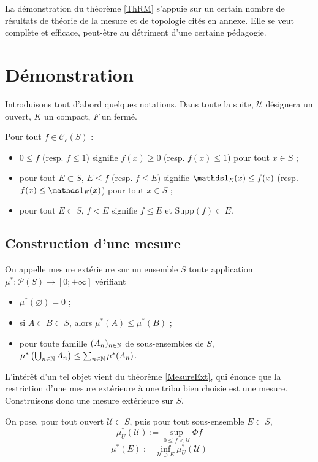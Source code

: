 \documentclass{article}
\begin{document}
La démonstration du théorème \ref{ThRM} s'appuie sur un certain nombre de résultats de théorie de la mesure et de topologie cités en annexe. Elle se veut complète et efficace, peut-être au détriment d'une certaine pédagogie.

\section{Démonstration}

Introduisons tout d'abord quelques notations. Dans toute la suite, $\mathcal U$ désignera un ouvert, $K$ un compact, $F$ un fermé.

Pour tout $f\in\mathcal C_c(S)$ :
\begin{itemize}
\item $0\leq f$ (resp. $f\leq1$) signifie $f(x)\geq 0$ (resp. $f(x)\leq1$) pour tout $x\in S$ ;
\item pour tout $E\subset S$, $E\leq f$ (resp. $f\leq E$) signifie $\Ind{E}(x)\leq f(x)$ (resp. $f(x)\leq\Ind{E}(x)$) pour tout $x\in S$ ;
\item pour tout $E\subset S$, $f<E$ signifie $f\leq E$ et $\mathrm{Supp}(f)\subset E$.
\end{itemize}

\subsection{Construction d'une mesure}

On appelle mesure extérieure sur un ensemble $S$ toute application $\mu^*:\mathcal P(S)\to[0;+\infty]$ vérifiant
\begin{itemize}
\item $\mu^*(\varnothing)=0$ ;
\item si $A\subset B\subset S$, alors $\mu^*(A)\leq\mu^*(B)$ ;
\item pour toute famille $(A_n)_{n\in\mathbb{N}}$ de sous-ensembles de $S$, $\mu^*\left(\bigcup_{n\in\mathbb{N}}A_n\right)\leq\sum_{n\in\mathbb{N}}\mu^*(A_n)$. 
\end{itemize}

L'intérêt d'un tel objet vient du théorème \ref{MesureExt}, qui énonce que la restriction d'une mesure extérieure à une tribu bien choisie est une mesure. Construisons donc une mesure extérieure sur $S$.
\bigskip

On pose, pour tout ouvert $\mathcal U\subset S$, puis pour tout sous-ensemble $E\subset S$,
$$\mu_U^*(\mathcal U):=\sup_{0\leq f<\mathcal U}\Phi f$$
$$\mu^*(E):=\inf_{\mathcal U\supset E}\mu_U^*(\mathcal U)$$
\end{document}
